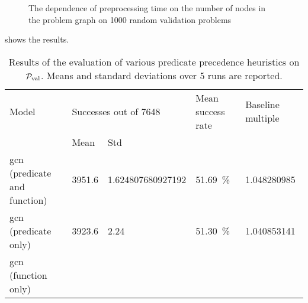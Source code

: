 \begin{figure}[h]
\caption{The dependence of preprocessing time on the number of nodes in the problem graph on 1000 random validation problems}
\label{fig:preprocessing}
\centering

\end{figure}

 shows the results.

\begin{table*}
\caption{
Results of the evaluation of various predicate precedence heuristics on $\operatorname{\mathcal{P}_{\mathrm{val}}}$.
Means and standard deviations over 5 runs are reported.
}
\label{tab:results}
\centering
\begin{tabular}{l|ll|ll}

Model & \multicolumn{2}{l}{Successes out of \num{7648}} & Mean success rate & Baseline multiple \\
& Mean & Std & & \\

\hline


\acrshort{gcn} (predicate and function) &

\num{3951.6} &
\num[round-mode=places,round-precision=2]{1.624807680927192} &
\SI{51.69}{\percent} &
\num[round-mode=places,round-precision=3]{1.048280985} \\


\acrshort{gcn} (predicate only) &

\num{3923.6} &

\num{2.24} &

\SI{51.30}{\percent} &

\num[round-mode=places,round-precision=3]{1.040853141} \\


\acrshort{gcn} (function only) &


\end{tabular}
\end{table*}
